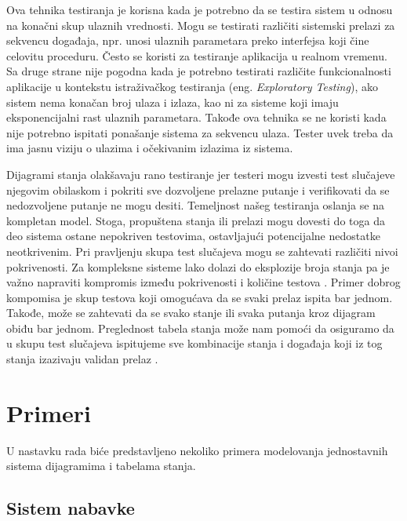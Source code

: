 \documentclass[a4paper]{article}
\begin{document}
Ova tehnika testiranja je korisna kada je potrebno da se testira sistem u odnosu na konačni skup ulaznih vrednosti. Mogu se testirati različiti sistemski prelazi za sekvencu događaja, npr. unosi ulaznih parametara preko interfejsa  koji čine celovitu proceduru. Često se koristi za testiranje aplikacija u realnom vremenu. Sa druge strane nije pogodna kada je potrebno testirati različite funkcionalnosti aplikacije u kontekstu istraživačkog testiranja (eng. \textit{Exploratory Testing}), ako sistem nema konačan broj ulaza i izlaza, kao ni za sisteme koji imaju eksponencijalni rast ulaznih parametara.
Takođe ova tehnika se ne koristi kada nije potrebno ispitati ponašanje sistema za sekvencu ulaza.
Tester uvek treba da ima jasnu viziju o ulazima i očekivanim izlazima iz sistema. \cite{StateTestingExample} \cite{SoftwareTesting}

Dijagrami stanja olakšavaju rano testiranje jer testeri mogu izvesti test slučajeve njegovim obilaskom i pokriti sve dozvoljene prelazne putanje i verifikovati da se nedozvoljene putanje ne mogu desiti. Temeljnost našeg testiranja oslanja se na kompletan model. Stoga, propuštena stanja ili prelazi mogu dovesti do toga da deo sistema ostane nepokriven testovima, ostavljajući potencijalne nedostatke neotkrivenim. Pri pravljenju skupa test slučajeva mogu se zahtevati različiti nivoi pokrivenosti. Za kompleksne sisteme lako dolazi do eksplozije broja stanja pa je važno napraviti kompromis između pokrivenosti i količine testova \cite{StateTransition}. Primer dobrog kompomisa je skup testova koji omogućava da se svaki prelaz ispita bar jednom. Takođe, može se zahtevati da se svako stanje ili svaka putanja kroz dijagram obiđu bar jednom. Preglednost tabela stanja može nam pomoći da osiguramo da u skupu test slučajeva ispitujeme sve kombinacije stanja i događaja koji iz tog stanja izazivaju validan prelaz \cite{ModelingSystemStates}.

\section{Primeri}
\label{sec:primeri}
U nastavku rada biće predstavljeno nekoliko primera modelovanja jednostavnih sistema dijagramima i tabelama stanja.

\subsection{Sistem nabavke \cite{ModelingSystemStates}}
\label{subsec:primer1}
\end{document}

